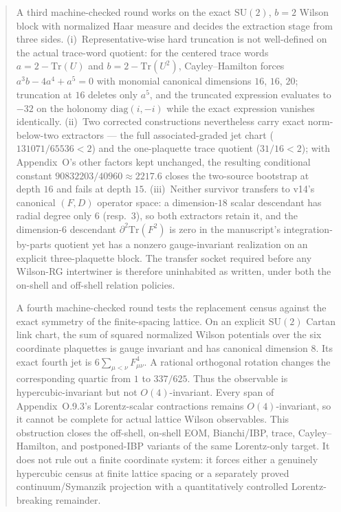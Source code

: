 \documentclass[11pt]{article}
\theoremstyle{definition}
\newcommand{\Tr}{\mathrm{Tr}}
\begin{document}
\begin{abstract}
A third machine-checked round works on the exact $\mathrm{SU}(2)$, $b=2$
Wilson block with normalized Haar measure and decides the extraction stage
from three sides. (i)~Representative-wise hard truncation is not well-defined
on the actual trace-word quotient: for the centered trace words
$a=2-\Tr(U)$ and $b=2-\Tr(U^2)$, Cayley--Hamilton forces $a^3b-4a^4+a^5=0$
with monomial canonical dimensions $16$, $16$, $20$; truncation at $16$
deletes only $a^5$, and the truncated expression evaluates to $-32$ on the
holonomy $\mathrm{diag}(i,-i)$ while the exact expression vanishes
identically. (ii)~Two corrected constructions nevertheless carry exact
norm-below-two extractors --- the full associated-graded jet chart
($131071/65536<2$) and the one-plaquette trace quotient ($31/16<2$); with
Appendix~O's other factors kept unchanged, the resulting conditional constant
$90832203/40960\approx2217.6$ closes the two-source bootstrap at depth $16$
and fails at depth $15$. (iii)~Neither survivor transfers to v14's canonical
$(F,D)$ operator space: a dimension-$18$ scalar descendant has radial degree
only $6$ (resp.\ $3$), so both extractors retain it, and the dimension-$6$
descendant $\partial^2\Tr(F^2)$ is zero in the manuscript's
integration-by-parts quotient yet has a nonzero gauge-invariant realization
on an explicit three-plaquette block. The transfer socket required before any
Wilson-RG intertwiner is therefore uninhabited as written, under both the
on-shell and off-shell relation policies.

A fourth machine-checked round tests the replacement census against the exact
symmetry of the finite-spacing lattice. On an explicit $\mathrm{SU}(2)$ Cartan
link chart, the sum of squared normalized Wilson potentials over the six
coordinate plaquettes is gauge invariant and has canonical dimension $8$.
Its exact fourth jet is $6\sum_{\mu<\nu}F_{\mu\nu}^{4}$. A rational orthogonal
rotation changes the corresponding quartic from $1$ to $337/625$. Thus the
observable is hypercubic-invariant but not $O(4)$-invariant. Every span of
Appendix~O.9.3's Lorentz-scalar contractions remains $O(4)$-invariant, so it
cannot be complete for actual lattice Wilson observables. This obstruction
closes the off-shell, on-shell EOM, Bianchi/IBP, trace, Cayley--Hamilton, and
postponed-IBP variants of the same Lorentz-only target. It does not rule out a
finite coordinate system: it forces either a genuinely hypercubic census at
finite lattice spacing or a separately proved continuum/Symanzik projection
with a quantitatively controlled Lorentz-breaking remainder.


\end{abstract}
\end{document}
